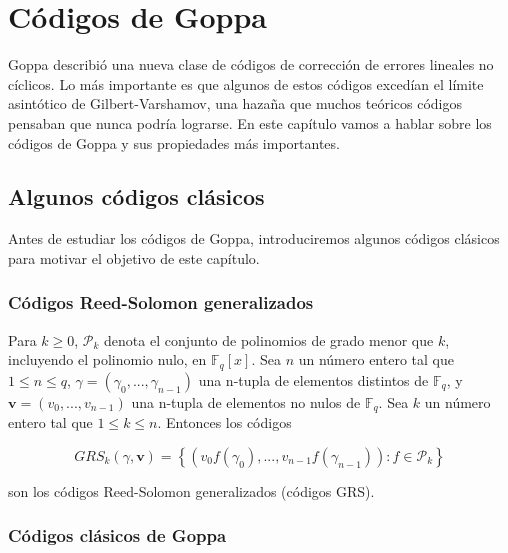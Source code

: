 
\chapter{Códigos de Goppa}


Goppa describió una nueva clase de códigos de corrección de errores lineales no cíclicos. Lo más importante es que algunos de estos códigos excedían el límite asintótico de Gilbert-Varshamov, una hazaña que muchos teóricos códigos pensaban que nunca podría lograrse. En este capítulo vamos a hablar sobre los códigos de Goppa y sus propiedades más importantes.


\section{Algunos códigos clásicos}

Antes de estudiar los códigos de Goppa, introduciremos algunos códigos clásicos para motivar el objetivo de este capítulo.

\subsection{Códigos Reed-Solomon generalizados}

Para $k \geq 0$, $\mathcal{P}_k$ denota el conjunto de polinomios de grado menor que $k$, incluyendo el polinomio nulo, en $\mathbb{F}_q[x]$. Sea $n$ un número entero tal que $1 \leq n \leq q$, $\gamma = (\gamma _0,..., \gamma _{n-1})$ una n-tupla de elementos distintos de $\mathbb{F}_q$, y $\textbf{v} = (v_0,...,v_{n-1})$ una n-tupla de elementos no nulos de $\mathbb{F}_q$. Sea $k$ un número entero tal que $1 \leq k \leq n$. Entonces los códigos

$$GRS_k (\gamma, \textbf{v}) = \left\{ \left( v_0 f(\gamma_0), ..., v_{n-1}f(\gamma_{n-1}) \right) : f \in \mathcal{P}_k \right\}$$

son los códigos Reed-Solomon generalizados (códigos GRS).

\subsection{Códigos clásicos de Goppa}

